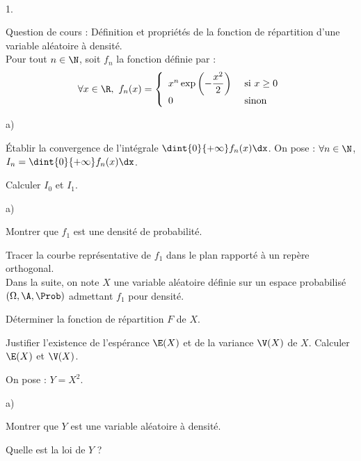 \begin{exerciceAP}~
\begin{noliste}{1.}
    \setlength{\itemsep}{2mm}
  \item Question de cours : Définition et propriétés de la fonction de 
  répartition d'une variable aléatoire à densité.\\
  Pour tout $n\in\N$, soit $f_n$ la fonction définie par :
  \[
    \forall x\in\R, \ f_n(x)= \left\{
    \begin{array}{ll}
      x^n \exp\left(-\dfrac{x^2}{2}\right) & \mbox{ si $x\geq 0$}\\
      0 & \mbox{ sinon}
    \end{array}
    \right.
  \]
  
  \item 
  \begin{noliste}{a)}
    \setlength{\itemsep}{2mm}
    \item Établir la convergence de l'intégrale $\dint{0}{+\infty} 
    f_n(x)\dx$. On pose : $\forall n\in\N$, $I_n=\dint{0}{+\infty} 
    f_n(x)\dx$.
    
    \item Calculer $I_0$ et $I_1$.
  \end{noliste}
  
  \item 
  \begin{noliste}{a)}
    \setlength{\itemsep}{2mm}
    \item Montrer que $f_1$ est une densité de probabilité.
    
    \item Tracer la courbe représentative de $f_1$ dans le plan 
    rapporté à un repère orthogonal.\\
    Dans la suite, on note $X$ une variable aléatoire définie sur 
    un espace probabilisé $(\Omega, \A,\Prob)$ admettant $f_1$ 
    pour densité.
    
    \item Déterminer la fonction de répartition $F$ de $X$.
    
    \item Justifier l'existence de l'espérance $\E(X)$ et de la 
    variance $\V(X)$ de $X$. Calculer $\E(X)$ et $\V(X)$.
  \end{noliste}
  
  \item On pose : $Y=X^2$.
  \begin{noliste}{a)}
    \setlength{\itemsep}{2mm}
    \item Montrer que $Y$ est une variable aléatoire à densité.
    
    \item Quelle est la loi de $Y$ ?
  \end{noliste}
\end{noliste}
\end{exerciceAP} 


